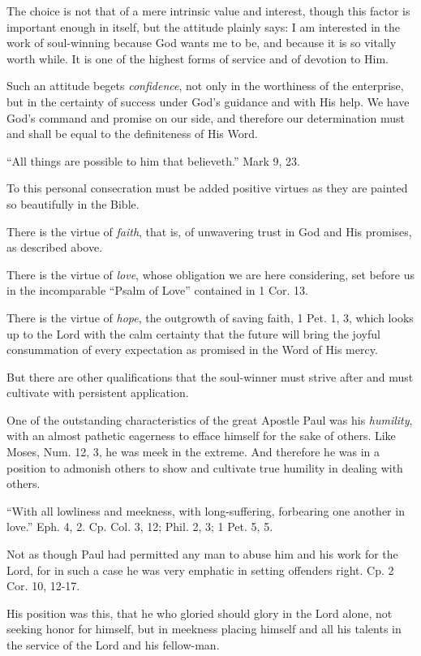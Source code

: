 \documentclass[
]{book}
\begin{document}
The choice is not that of a mere intrinsic value and interest, though this factor is important enough in itself, but the attitude plainly says: I am interested in the work of soul-winning because God wants me to be, and because it is so vitally worth while. It is one of the highest forms of service and of devotion to Him.

Such an attitude begets \emph{confidence}, not only in the worthiness of the enterprise, but in the certainty of success under God's guidance and with His help. We have God's command and promise on our side, and therefore our determination must and shall be equal to the definiteness of His Word.

``All things are possible to him that believeth.'' Mark 9, 23.

To this personal consecration must be added positive virtues as they are painted so beautifully in the Bible.

There is the virtue of \emph{faith}, that is, of unwavering trust in God and His promises, as described above.

There is the virtue of \emph{love}, whose obligation we are here considering, set before us in the incomparable ``Psalm of Love'' contained in 1 Cor. 13.

There is the virtue of \emph{hope}, the outgrowth of saving faith, 1 Pet. 1, 3, which looks up to the Lord with the calm certainty that the future will bring the joyful consummation of every expectation as promised in the Word of His mercy.

But there are other qualifications that the soul-winner must strive after and must cultivate with persistent application.

One of the outstanding characteristics of the great Apostle Paul was his \emph{humility}, with an almost pathetic eagerness to efface himself for the sake of others. Like Moses, Num. 12, 3, he was meek in the extreme. And therefore he was in a position to admonish others to show and cultivate true humility in dealing with others.

``With all lowliness and meekness, with long-suffering, forbearing one another in love.'' Eph. 4, 2. Cp. Col. 3, 12; Phil. 2, 3; 1 Pet. 5, 5.

Not as though Paul had permitted any man to abuse him and his work for the Lord, for in such a case he was very emphatic in setting offenders right. Cp. 2 Cor. 10, 12-17.

His position was this, that he who gloried should glory in the Lord alone, not seeking honor for himself, but in meekness placing himself and all his talents in the service of the Lord and his fellow-man.
\end{document}
